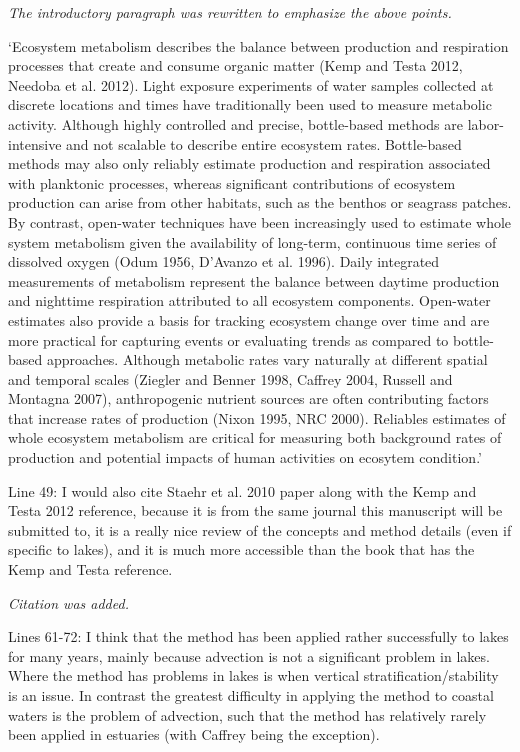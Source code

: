 \documentclass[letterpaper,12pt]{article}\usepackage[]{graphicx}\usepackage[]{color}
\begin{document}
{\it The introductory paragraph was rewritten to emphasize the above points.

`Ecosystem metabolism describes the balance between production and respiration processes that create and consume organic matter (Kemp and Testa 2012, Needoba et al. 2012).  Light exposure experiments of water samples collected at discrete locations and times have traditionally been used to measure metabolic activity.  Although highly controlled and precise, bottle-based methods are labor-intensive and not scalable to describe entire ecosystem rates.  Bottle-based methods may also only reliably estimate production and respiration associated with planktonic processes, whereas significant contributions of ecosystem production can arise from other habitats, such as the benthos or seagrass patches.  By contrast, open-water techniques have been increasingly used to estimate whole system metabolism given the availability of long-term, continuous time series of dissolved oxygen (Odum 1956, D'Avanzo et al. 1996). Daily integrated measurements of metabolism represent the balance between daytime production and nighttime respiration attributed to all ecosystem components.  Open-water estimates also provide a basis for tracking ecosystem change over time and are more practical for capturing events or evaluating trends as compared to bottle-based approaches. Although metabolic rates vary naturally at different spatial and temporal scales (Ziegler and Benner 1998, Caffrey 2004, Russell and Montagna 2007), anthropogenic nutrient sources are often contributing factors that increase rates of production (Nixon 1995, NRC 2000).  Reliables estimates of whole ecosystem metabolism are critical for measuring both background rates of production and potential impacts of human activities on ecosytem condition.'
}

Line 49: I would also cite Staehr et al. 2010 paper along with the Kemp and Testa 2012 reference, because it is from the same journal this manuscript will be submitted to, it is a really nice review of the concepts and method details (even if specific to lakes), and it is much more accessible than the book that has the Kemp and Testa reference.

{\it Citation was added.}

Lines 61-72: I think that the method has been applied rather successfully to lakes for many years, mainly because advection is not a significant problem in lakes. Where the method has problems in lakes is when vertical stratification/stability is an issue. In contrast the greatest difficulty in applying the method to coastal waters is the problem of advection, such that the method has relatively rarely been applied in estuaries (with Caffrey being the exception).
\end{document}
